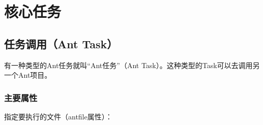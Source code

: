 \chapter{核心任务}

\section{任务调用（Ant Task）}

	有一种类型的Ant任务就叫“Ant任务”（Ant Task）。这种类型的Task可以去调用另一个Ant项目。

	\subsection{主要属性}

	指定要执行的文件（antfile属性）：

	

	
